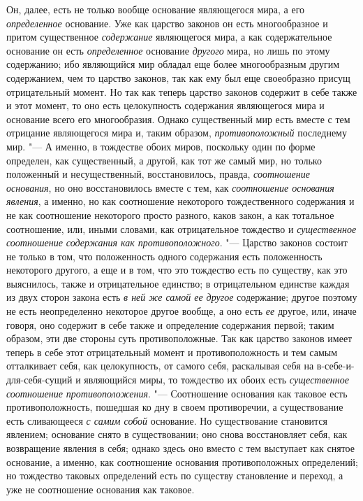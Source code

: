 Он, далее, есть не только вообще основание являющегося мира, а его
{\em определенное} основание. Уже как царство законов
он есть многообразное и притом существенное
{\em содержание} являющегося мира, а как содержательное
основание он есть {\em определенное} основание
{\em другого} мира, но лишь по этому содержанию; ибо
являющийся мир обладал еще более многообразным другим содержанием, чем то
царство законов, так как ему был еще своеобразно присущ отрицательный
момент. Но так как теперь царство законов содержит в себе также и этот
момент, то оно есть целокупность содержания являющегося мира и основание
всего его многообразия. Однако существенный мир есть вместе с тем отрицание
являющегося мира и, таким образом,
{\em противоположный} последнему мир. "--- А именно, в
тождестве обоих миров, поскольку один по форме определен, как существенный,
а другой, как тот же самый мир, но только положенный и несущественный,
восстановилось, правда, {\em соотношение основания}, но
оно восстановилось вместе с тем, как {\em соотношение
основания явления}, а именно, но как соотношение некоторого тождественного
содержания и не как соотношение некоторого просто разного, каков закон, а
как тотальное соотношение, или, иными словами, как отрицательное тождество
и {\em существенное соотношение содержания как
противоположного}. "--- Царство законов состоит не только в том, что
положенность одного содержания есть положенность некоторого другого, а еще
и в том, что это тождество есть по существу, как это выяснилось, также и
отрицательное единство; в отрицательном единстве каждая из двух сторон
закона есть {\em в ней же самой ее другое} содержание;
другое поэтому не есть неопределенно некоторое другое вообще, а оно есть
{\em ее} другое, или, иначе говоря, оно содержит в себе
также и определение содержания первой; таким образом, эти две стороны суть
противоположные. Так как царство законов имеет теперь в себе этот
отрицательный момент и противоположность и тем самым отталкивает себя, как
целокупность, от самого себя, раскалывая себя на в-себе-и-для-себя-сущий и
являющийся миры, то тождество их обоих есть
{\em существенное соотношение противоположения}. "---
Соотношение основания как таковое есть противоположность, пошедшая ко дну в
своем противоречии, а существование есть сливающееся
{\em с самим собой} основание. Но существование
становится явлением; основание снято в существовании; оно снова
восстановляет себя, как возвращение явления в себя; однако здесь оно вместо
с тем выступает как снятое основание, а именно, как соотношение основания
противоположных определений; но тождество таковых определений есть по
существу становление и переход, а уже не соотношение основания как таковое.

